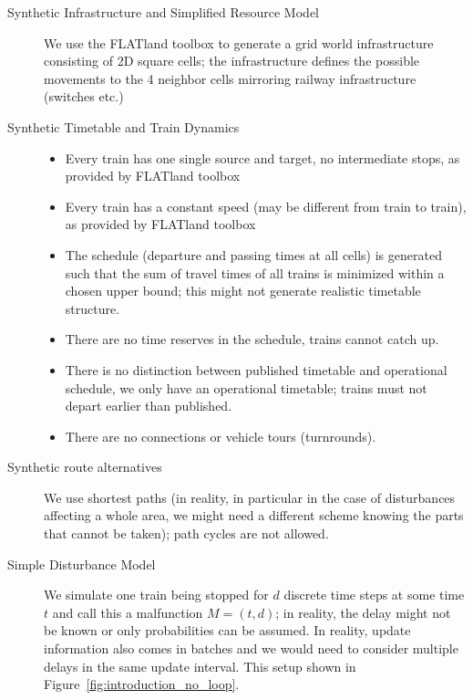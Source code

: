 \documentclass{article}
\begin{document}
\begin{description}
\item[Synthetic Infrastructure and Simplified Resource Model] We use the FLATland toolbox \cite{aicrowdFLATland} to generate a grid world infrastructure consisting of 2D square cells; the infrastructure defines the possible movements to the 4 neighbor cells mirroring railway infrastructure (switches etc.)
\item[Synthetic Timetable and Train Dynamics]
\begin{itemize}
    \item Every train has one single source and target, no intermediate stops, as provided by FLATland toolbox \cite{aicrowdFLATland}
    \item Every train has a constant speed (may be different from train to train), as provided by FLATland toolbox \cite{aicrowdFLATland}
    \item The schedule (departure and passing times at all cells) is generated such that the sum of travel times of all trains is minimized within a chosen upper bound; this might not generate realistic timetable structure.
    \item There are no time reserves in the schedule, trains cannot catch up.
    \item There is no distinction between published timetable and operational schedule, we only have an operational timetable; trains must not depart earlier than published.
    \item There are no connections or vehicle tours (turnrounds).
\end{itemize}
\item[Synthetic route alternatives] We use shortest paths (in reality, in particular in the case of disturbances affecting a whole area, we might need a different scheme knowing the parts that cannot be taken); path cycles are not allowed.
\item[Simple Disturbance Model] We simulate one train being stopped for $d$ discrete time steps at some time $t$ and call this a malfunction $M=(t,d)$; in reality, the delay might not be known or only probabilities can be assumed. In reality, update information also comes in batches and we would need to consider multiple delays in the same update interval. This setup shown in Figure~\ref{fig:introduction_no_loop}.
\end{description}
%
\end{document}
